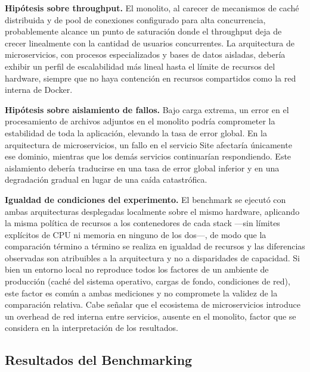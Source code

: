 \textbf{Hipótesis sobre throughput.} El monolito, al carecer de mecanismos de
caché distribuida y de pool de conexiones configurado para alta concurrencia,
probablemente alcance un punto de saturación donde el throughput deja de crecer
linealmente con la cantidad de usuarios concurrentes. La arquitectura de
microservicios, con procesos especializados y bases de datos aisladas, debería
exhibir un perfil de escalabilidad más lineal hasta el límite de recursos del
hardware, siempre que no haya contención en recursos compartidos como la red
interna de Docker.

\textbf{Hipótesis sobre aislamiento de fallos.} Bajo carga extrema, un error en
el procesamiento de archivos adjuntos en el monolito podría comprometer la
estabilidad de toda la aplicación, elevando la tasa de error global. En la
arquitectura de microservicios, un fallo en el servicio Site afectaría
únicamente ese dominio, mientras que los demás servicios continuarían
respondiendo. Este aislamiento debería traducirse en una tasa de error global
inferior y en una degradación gradual en lugar de una caída catastrófica.

\textbf{Igualdad de condiciones del experimento.} El benchmark se ejecutó con
ambas arquitecturas desplegadas localmente sobre el mismo hardware, aplicando la
misma política de recursos a los contenedores de cada stack ---sin límites
explícitos de CPU ni memoria en ninguno de los dos---, de modo
que la comparación término a término se realiza en igualdad de recursos y las
diferencias observadas son atribuibles a la arquitectura y no a disparidades de
capacidad. Si bien un entorno local no reproduce todos los factores de un
ambiente de producción (caché del sistema operativo, cargas de fondo,
condiciones de red), este factor es común a ambas mediciones y no compromete la
validez de la comparación relativa. Cabe señalar que el ecosistema de
microservicios introduce un overhead de red interna entre servicios, ausente en
el monolito, factor que se considera en la interpretación de los resultados.

\subsection{Resultados del Benchmarking}

